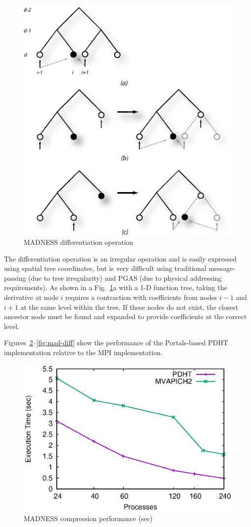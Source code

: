 \begin{figure}
  \centering
  \includegraphics[width=.75\linewidth]{figs/diff}
  \caption{MADNESS differentiation operation}
  \label{fig:diff}
\end{figure}


The differentiation operation is an irregular operation and is easily expressed
using spatial tree coordinates, but is very difficult using traditional
message-passing (due to tree irregularity) and PGAS (due to physical addressing
requirements). As shown in a Fig.~\ref{fig:diff}a with a 1-D function tree,
taking the derivative at node $i$ requires a contraction with coefficients
from nodes $i-1$ and $i+1$ at the same level within the tree. If these nodes
do not exist, the closest ancestor node must be found and expanded to provide
coefficients at the correct level. 


Figures~\ref{fig:mad-compress}--\ref{fig:mad-diff} show the performance of the
Portals-based PDHT implementation relative to the MPI implementation.

\begin{figure}
  \centering
  \includegraphics[width=.88\linewidth]{plots/compress}
  \caption{MADNESS compression performance (sec)}
  \label{fig:mad-compress}
\end{figure}

